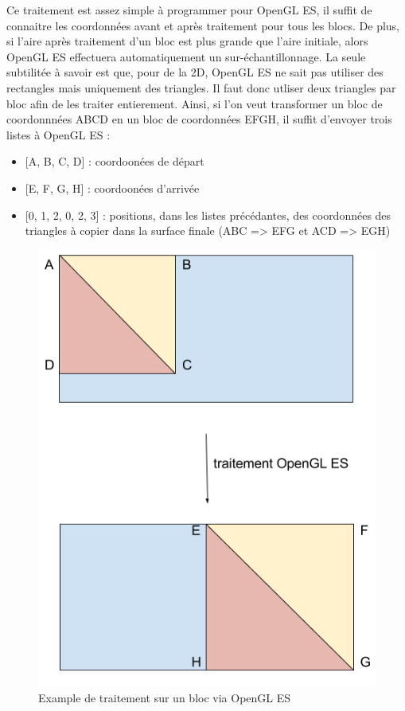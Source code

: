 \documentclass[11pt,a4paper]{article}
\begin{document}
\bigbreak
Ce traitement est assez simple à programmer pour OpenGL ES, il suffit de connaitre les coordonnées avant et après traitement pour tous les blocs.
De plus, si l'aire après traitement d'un bloc est plus grande que l'aire initiale, alors OpenGL ES effectuera automatiquement un sur-échantillonnage.
La seule subtilitée à savoir est que, pour de la 2D, OpenGL ES ne sait pas utiliser des rectangles mais uniquement des triangles.
Il faut donc utliser deux triangles par bloc afin de les traiter entierement.
Ainsi, si l'on veut transformer un bloc de coordonnnées ABCD en un bloc de coordonnées EFGH, il suffit d'envoyer trois listes à OpenGL ES :

\bigbreak
\begin{itemize}
\item{[A, B, C, D] : coordoonées de départ}
\item{[E, F, G, H] : coordoonées d'arrivée}
\item{[0, 1, 2, 0, 2, 3] : positions, dans les listes précédantes, des coordonnées des triangles à copier dans la surface finale (ABC => EFG et ACD => EGH)}
\end{itemize}

\begin{figure}[H]
\begin{center}
\includegraphics[scale=0.35]{images/OpenGL_ES.png}
\end{center}
\caption{Example de traitement sur un bloc via OpenGL ES}
\label{}
\end{figure}
\end{document}
